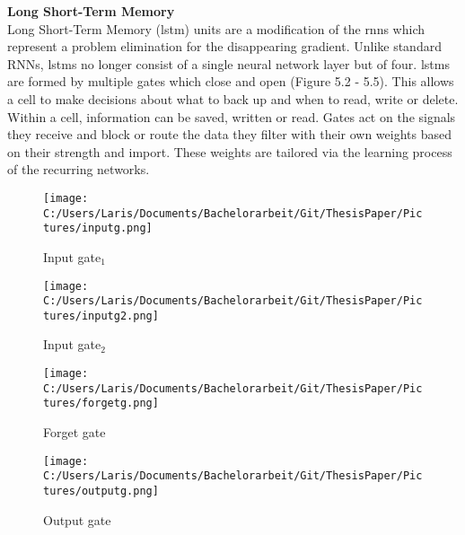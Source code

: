\documentclass[a4paper, 11pt,titlepage,oneside,openany]{book}
\begin{document}
\noindent\textbf{Long Short-Term Memory} \\
\noindent Long Short-Term Memory (\gls{lstm}) units are a modification of the \gls{rnn}s which represent a problem elimination for the disappearing gradient. Unlike standard RNNs, \gls{lstm}s no longer consist of a single neural network layer but of four. \gls{lstm}s are formed by multiple gates which close and open (Figure 5.2 - 5.5). This allows a cell to make decisions about what to back up and when to read, write or delete. Within a cell, information can be saved, written or read. Gates act on the signals they receive and block or route the data they filter with their own weights based on their strength and import. These weights are tailored via the learning process of the recurring networks. 
\begin{figure}[h]
	\begin{minipage}[b]{0.4\linewidth}
		\texttt{[image: C:/Users/Laris/Documents/Bachelorarbeit/Git/ThesisPaper/Pictures/inputg.png]}
		\caption{Input gate$_1$ \cite{rnn}}
	\end{minipage}
	\hfill
	\begin{minipage}[b]{0.4\linewidth}
		\texttt{[image: C:/Users/Laris/Documents/Bachelorarbeit/Git/ThesisPaper/Pictures/inputg2.png]}
		\caption{Input gate$_2$ \cite{rnn}}
	\end{minipage}
	\begin{minipage}[b]{0.4\linewidth}
		\texttt{[image: C:/Users/Laris/Documents/Bachelorarbeit/Git/ThesisPaper/Pictures/forgetg.png]}
		\caption{Forget gate \cite{rnn}}
	\end{minipage}
	\hfill
	\begin{minipage}[b]{0.4\linewidth}
		\texttt{[image: C:/Users/Laris/Documents/Bachelorarbeit/Git/ThesisPaper/Pictures/outputg.png]}
		\caption{Output gate \cite{rnn}}
	\end{minipage}
\end{figure}
\end{document}
